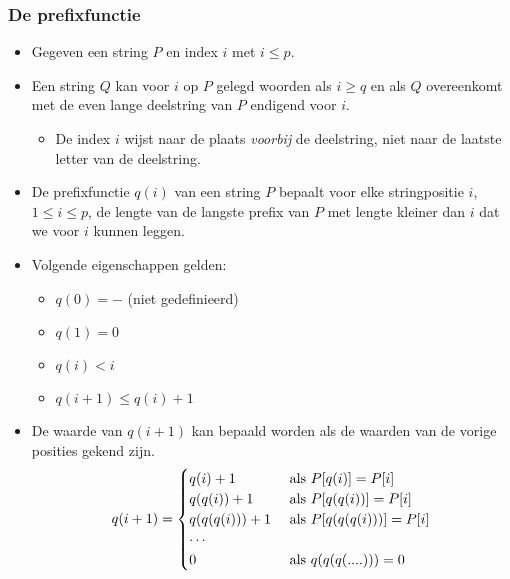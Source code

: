 \subsubsection{De prefixfunctie}
\begin{itemize}
    \item Gegeven een string $P$ en index $i$ met $i \leq p$.
    \item Een string $Q$ kan voor $i$ op $P$ gelegd woorden als $i \geq q$ en als $Q$ overeenkomt met de even lange deelstring van $P$ endigend voor $i$.
    \begin{itemize}
        \item De index $i$ wijst naar de plaats \textit{voorbij} de deelstring, niet naar de laatste letter van de deelstring.
    \end{itemize}
    \item De prefixfunctie $q(i)$ van een string $P$ bepaalt voor elke stringpositie $i$, $1 \leq i \leq p$, de lengte van de langste prefix van $P$ met lengte kleiner dan $i$ dat we voor $i$ kunnen leggen.

    \item Volgende eigenschappen gelden:
    \begin{itemize}
        \item $q(0) = -$ (niet gedefinieerd)
        \item $q(1) = 0$
        \item $q(i) < i$
        \item $q(i + 1) \leq q(i) + 1$
    \end{itemize}
    \item De waarde van $q(i + 1)$ kan bepaald worden als de waarden van de vorige posities gekend zijn.
    $$q(i + 1) = \begin{cases}
        q(i) + 1 & \hbox{ als } P[q(i)] = P[i]  \\
        q(q(i)) + 1 & \hbox{ als } P[q(q(i))] = P[i] \\
        q(q(q(i))) + 1 & \hbox{ als } P[q(q(q(i)))] = P[i] \\
        \cdots \\
        0 & \hbox { als } q(q(q(....))) = 0
    \end{cases}$$


\end{itemize}
